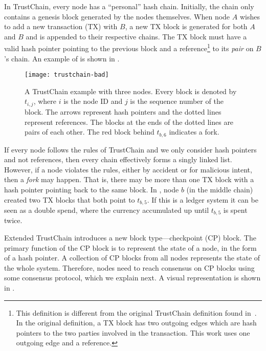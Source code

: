 In TrustChain, every node has a ``personal'' hash chain. 
Initially, the chain only contains a genesis block generated by the nodes themselves.
When node $A$ wishes to add a new transaction (TX) with $B$,
a new TX block is generated for both $A$ and $B$ and is appended to their respective chains.
The TX block must have a valid hash pointer pointing to the previous block and a reference\footnote{This definition is different from the original TrustChain definition found in~\cite{multichain}.
    In the original definition, a TX block has two outgoing edges which are hash pointers to the two parties involved in the transaction.
    This work uses one outgoing edge and a reference.} to its \emph{pair} on $B$'s chain.
An example of is shown in .

\begin{figure}
    \texttt{[image: trustchain-bad]}
    \centering
    \caption{
    A TrustChain example with three nodes.
    Every block is denoted by $t_{i,j}$, where $i$ is the node ID and $j$ is the sequence number of the block.
    The arrows represent hash pointers and the dotted lines represent references.
    The blocks at the ends of the dotted lines are pairs of each other.
    The red block behind $t_{b, 6}$ indicates a fork.}
    \label{fig:trustchain-bad}
\end{figure}

If every node follows the rules of TrustChain and we only consider hash pointers and not references,
then every chain effectively forms a singly linked list.
However, if a node violates the rules,
either by accident or for malicious intent,
then a \emph{fork} may happen.
That is, there may be more than one TX block with a hash pointer pointing back to the same block.
In , node $b$ (in the middle chain) created two TX blocks that both point to $t_{b, 5}$.
If this is a ledger system it can be seen as a double spend, where the currency accumulated up until $t_{b, 5}$ is spent twice.

Extended TrustChain introduces a new block type---checkpoint (CP) block.
The primary function of the CP block is to represent the state of a node, in the form of a hash pointer.
A collection of CP blocks from all nodes represents the state of the whole system.
Therefore, nodes need to reach consensus on CP blocks using some consensus protocol, which we explain next.
A visual representation is shown in .

